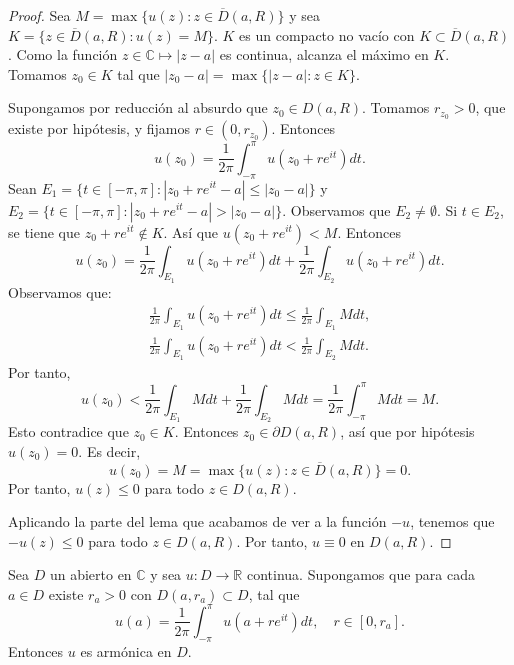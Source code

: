 \begin{proof}
    Sea $M = \max\{u(z) : z \in \overline{D}(a, R)\}$ y sea $K = \{z \in \overline{D}(a, R) : u(z) = M\}$.
    $K$ es un compacto no vacío con $K \subset \overline{D}(a, R)$.
    Como la función $z \in \mathbb{C} \mapsto |z-a|$ es continua, alcanza el máximo en $K$.
    Tomamos $z_0 \in K$ tal que $|z_0-a| = \max\{|z-a| : z \in K\}$.

    Supongamos por reducción al absurdo que $z_0 \in D(a, R)$.
    Tomamos $r_{z_0} > 0$, que existe por hipótesis, y fijamos $r \in (0, r_{z_0})$.
    Entonces
    $$u(z_0) = \frac{1}{2\pi} \int_{-\pi}^\pi u(z_0 + re^{it})dt.$$
    Sean $E_1 = \{t \in [-\pi, \pi] : |z_0+re^{it}-a| \leq |z_0-a|\}$ y $E_2 = \{t \in [-\pi, \pi] : |z_0+re^{it}-a| > |z_0-a|\}$.
    Observamos que $E_2 \neq \emptyset$.
    Si $t \in E_2$, se tiene que $z_0 + re^{it} \notin K$.
    Así que $u(z_0 + re^{it}) < M$.
    Entonces
    $$u(z_0) = \frac{1}{2\pi} \int_{E_1} u(z_0 + re^{it})dt + \frac{1}{2\pi} \int_{E_2} u(z_0 + re^{it})dt.$$
    Observamos que:
    \begin{align*}
        \frac{1}{2\pi} \int_{E_1} u(z_0 + re^{it})dt \leq \frac{1}{2\pi} \int_{E_1} Mdt, \\
        \frac{1}{2\pi} \int_{E_1} u(z_0 + re^{it})dt < \frac{1}{2\pi} \int_{E_2} Mdt.
    \end{align*}
    Por tanto,
    $$u(z_0) < \frac{1}{2\pi} \int_{E_1} Mdt + \frac{1}{2\pi} \int_{E_2} Mdt = \frac{1}{2\pi} \int_{-\pi}^\pi Mdt = M.$$
    Esto contradice que $z_0 \in K$.
    Entonces $z_0 \in \partial D(a, R)$, así que por hipótesis $u(z_0) = 0$.
    Es decir,
    $$u(z_0) = M = \max\{u(z) : z \in \overline{D}(a, R)\} = 0.$$
    Por tanto, $u(z) \leq 0$ para todo $z \in D(a, R)$.

    Aplicando la parte del lema que acabamos de ver a la función $-u$, tenemos que $-u(z) \leq 0$ para todo $z \in D(a, R)$.
    Por tanto, $u \equiv 0$ en $D(a, R)$.
\end{proof}

\begin{theorem}
    Sea $D$ un abierto en $\mathbb{C}$ y sea $u: D \to \mathbb{R}$ continua.
    Supongamos que para cada $a \in D$ existe $r_a > 0$ con $D(a, r_a) \subset D$, tal que
    $$u(a) = \frac{1}{2\pi} \int_{-\pi}^\pi u(a + re^{it})dt, \quad r \in [0, r_a].$$
    Entonces $u$ es armónica en $D$.
\end{theorem}

